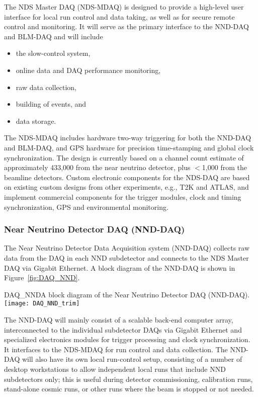 The NDS Master DAQ (NDS-MDAQ) is designed to provide a high-level user
interface for local run control and data taking, as well as for secure
remote control and monitoring.  It will serve as the primary interface
to the NND-DAQ and BLM-DAQ and will include 
\begin{itemize}
\item the slow-control system,
\item online data and DAQ performance monitoring,  
\item raw data collection,
\item building of events, and
\item data storage.   
\end{itemize}
The NDS-MDAQ includes hardware two-way triggering for both the NND-DAQ
and BLM-DAQ, and GPS hardware for precision time-stamping and global
clock synchronization.  The design is currently based on a channel
count estimate of approximately 433,000 from the near neutrino
detector, plus $<$1,000 from the beamline detectors.  Custom
electronic components for the NDS-DAQ are based on existing custom
designs from other experiments, e.g., T2K and ATLAS, and implement
commercial components for the trigger modules, clock and timing
synchronization, GPS and environmental monitoring.


\subsubsection{Near Neutrino Detector DAQ (NND-DAQ)} 
\label{cdrsec:nd:nnd:daq}


The Near Neutrino Detector Data Acquisition system (NND-DAQ) collects
raw data from the DAQ in each NND subdetector and connects to the NDS
Master DAQ via Gigabit Ethernet. A block diagram of the NND-DAQ is
shown in Figure~\ref{fig:DAQ_NND}. 
\begin{cdrfigure}
{DAQ_NND}{A block diagram of the Near Neutrino Detector DAQ (NND-DAQ).}
\texttt{[image: DAQ\_NND\_trim]}
\end{cdrfigure}
The NND-DAQ will mainly consist of a scalable back-end computer array,
interconnected to the individual subdetector DAQs via Gigabit
Ethernet and specialized electronics modules for trigger processing
and clock synchronization. It interfaces to the NDS-MDAQ for run
control and data collection. The NND-DAQ will also have its own local
run-control setup, consisting of a number of desktop workstations to
allow independent local runs that include NND subdetectors only; this
is useful during detector commissioning, calibration runs, stand-alone
cosmic runs, or other runs where the beam is stopped or not needed.

